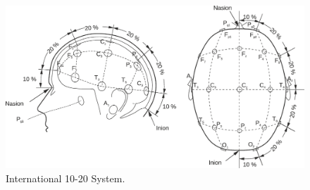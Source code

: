 \documentclass[12pt]{article}
\numberwithin{equation}{section}
\numberwithin{figure}{section}
\numberwithin{table}{section}
\begin{document}
\begin{figure}[ht]
    \centering
    \includegraphics[scale=0.75]{images/10_20_bembook_redrawn}
    \caption[International 10-20 System.]{International 10-20 System. \citep{nicolas-alonso_brain_2012}}
    \label{fig:eeg_1020}
\end{figure}
\end{document}
